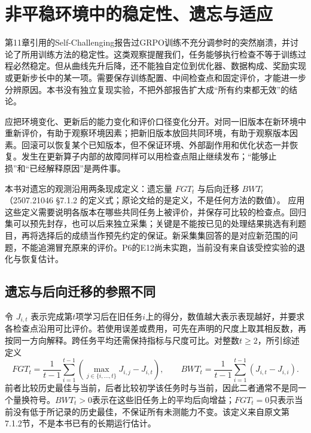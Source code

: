 \section{非平稳环境中的稳定性、遗忘与适应}
\label{sec:ch16-nonstationary}

\begin{sloppypar}
第11章引用的Self-Challenging报告过GRPO训练不充分调参时的突然崩溃，并讨论了所用训练方法的稳定性\cite{self-challenging-2506}。这类观察提醒我们，任务能够执行检查不等于训练过程必然稳定。但从曲线先升后降，还不能独自定位到优化器、数据构成、奖励实现或更新步长中的某一项。需要保存训练配置、中间检查点和固定评价，才能进一步分辨原因。本书没有独立复现实验，不把外部报告扩大成“所有约束都无效”的结论。

\end{sloppypar}

\begin{sloppypar}
应把环境变化、更新后的能力变化和评价口径变化分开。对同一旧版本在新环境中重新评价，有助于观察环境因素；把新旧版本放回共同环境，有助于观察版本因素。回滚可以恢复某个已知版本，但不保证环境、外部副作用和优化状态一并恢复。发生在更新算子内部的故障同样可以用检查点阻止继续发布；“能够止损”和“已经解释原因”是两件事。

\end{sloppypar}

\begin{sloppypar}
本书对遗忘的观测沿用两条现成定义：遗忘量 $FGT_t$ 与后向迁移 $BWT_t$（2507.21046 §7.1.2 的定义式\cite{self-evolving-survey-2507}；原论文给的是定义，不是任何方法的数值）。
应用这些定义需要说明各版本在哪些共同任务上被评价，并保存可比较的检查点。回归集可以预先封存，也可以后来独立采集；关键是不能按已见的处理结果挑选有利题目，再将选择后的成绩当作预先约定的保证。新采集集回答的是对应新范围的问题，不能追溯冒充原来的评价。P6的E12尚未实跑，当前没有来自该受控实验的退化与恢复估计。
\end{sloppypar}

\subsection{遗忘与后向迁移的参照不同}

令 $J_{i,t}$ 表示完成第$t$项学习后在旧任务$i$上的得分，数值越大表示表现越好，并要求各检查点沿用可比评价。若使用误差或费用，可先在声明的尺度上取其相反数，再按同一方向解释。跨任务平均还需保持指标与尺度可比。对整数$t\ge2$，所引综述定义
\begin{equation}
 FGT_t=\frac1{t-1}\sum_{i=1}^{t-1}\left(\max_{j\in\{i,\ldots,t\}}J_{i,j}-J_{i,t}\right),\qquad
 BWT_t=\frac1{t-1}\sum_{i=1}^{t-1}(J_{i,t}-J_{i,i}).
 \label{eq:ch16-retention}
\end{equation}
前者比较历史最佳与当前，后者比较初学该任务时与当前，因此二者通常不是同一个量换符号。$BWT_t>0$表示在这些旧任务上的平均后向增益；$FGT_t=0$只表示当前没有低于所记录的历史最佳，不保证所有未测能力不变。该定义来自原文第7.1.2节\cite{self-evolving-survey-2507}，不是本书已有的长期运行估计。

